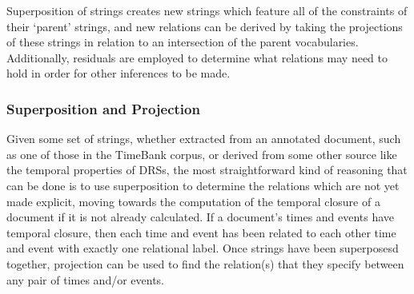 \documentclass[a4paper,12pt,leqno]{article}
\begin{document}
Superposition of strings creates new strings which feature all of the constraints of their `parent' strings, and new relations can be derived by taking the projections of these strings in relation to an intersection of the parent vocabularies. %
Additionally, residuals are employed to determine what relations may need to hold in order for other inferences to be made.

\subsubsection{Superposition and Projection}\label{ssub:superposition}
Given some set of strings, whether extracted from an annotated document, such as one of those in the TimeBank \citep{pustejovsky2006timebank} corpus, or derived from some other source like the temporal properties of DRSs, the most straightforward kind of reasoning that can be done is to use superposition to determine the relations which are not yet made explicit, moving towards the computation of the temporal closure of a document if it is not already calculated. If a document's times and events have temporal closure, then each time and event has been related to each other time and event with exactly one relational label. Once strings have been superposesd together, projection can be used to find the relation(s) that they specify between any pair of times and/or events.
\end{document}
